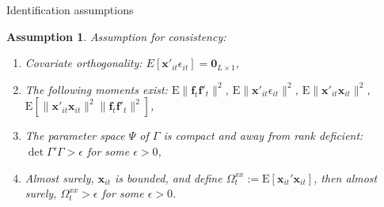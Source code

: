 \documentclass{beamer}
\newtheorem{assumption}{Assumption}
\begin{document}
\begin{frame}{Identification assumptions}
\begin{assumption}
Assumption for consistency:
\begin{enumerate}
    \item Covariate orthogonality: $E\left[\textbf{x}'_{it} \epsilon_{it}\right] = \textbf{0}_{L\times 1}$,
    
    \item The following moments exist: $\mathrm{E}\|\boldsymbol{f}_{t}\boldsymbol{f}'_{t}\|^2$, $\mathrm{E}\|\boldsymbol{x}'_{it}\epsilon_{it}\|^2$, $\mathrm{E}\|\boldsymbol{x}'_{it}\boldsymbol{x}_{it}\|^2$, $\mathrm{E}\left[\|\boldsymbol{x}'_{it}\boldsymbol{x}_{it}\|^2\|\boldsymbol{f}_{t}\boldsymbol{f}'_{t}\|^2 \right]$, 
    
    \item The parameter space $\Psi$ of $\Gamma$ is compact and away from rank deficient: $\det{\Gamma' \Gamma} > \epsilon$ for some $\epsilon>0$,
    
    \item Almost surely, $\boldsymbol{x}_{it}$ is bounded, and define $\Omega_t^{xx} := \mathrm{E}\left[ \boldsymbol{x}_{it}' \boldsymbol{x}_{it} \right]$, then almost surely, $\Omega_t^{xx} > \epsilon$ for some $\epsilon > 0$.
\end{enumerate}
\end{assumption}
\end{frame}
\end{document}
